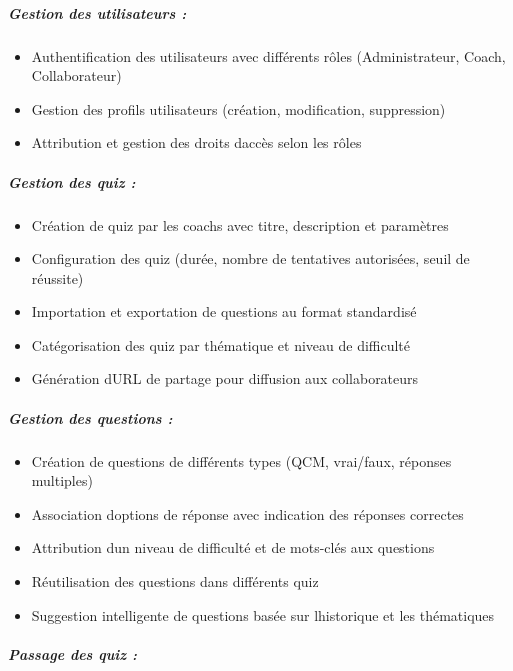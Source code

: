 \documentclass[12pt,a4paper,twoside]{report}
\begin{document}
\hypertarget{gestion-des-utilisateurs}{%
\subparagraph{Gestion des utilisateurs
:}\label{gestion-des-utilisateurs}}

\begin{itemize}
\item
  Authentification des utilisateurs avec différents rôles
  (Administrateur, Coach, Collaborateur)
\item
  Gestion des profils utilisateurs (création, modification, suppression)
\item
  Attribution et gestion des droits d\textquotesingle accès selon les
  rôles
\end{itemize}

\hypertarget{gestion-des-quiz}{%
\subparagraph{Gestion des quiz :}\label{gestion-des-quiz}}

\begin{itemize}
\item
  Création de quiz par les coachs avec titre, description et paramètres
\item
  Configuration des quiz (durée, nombre de tentatives autorisées, seuil
  de réussite)
\item
  Importation et exportation de questions au format standardisé
\item
  Catégorisation des quiz par thématique et niveau de difficulté
\item
  Génération d\textquotesingle URL de partage pour diffusion aux
  collaborateurs
\end{itemize}

\hypertarget{gestion-des-questions}{%
\subparagraph{Gestion des questions :}\label{gestion-des-questions}}

\begin{itemize}
\item
  Création de questions de différents types (QCM, vrai/faux, réponses
  multiples)
\item
  Association d\textquotesingle options de réponse avec indication des
  réponses correctes
\item
  Attribution d\textquotesingle un niveau de difficulté et de mots-clés
  aux questions
\item
  Réutilisation des questions dans différents quiz
\item
  Suggestion intelligente de questions basée sur
  l\textquotesingle historique et les thématiques
\end{itemize}

\hypertarget{passage-des-quiz}{%
\subparagraph{Passage des quiz :}\label{passage-des-quiz}}
\end{document}
